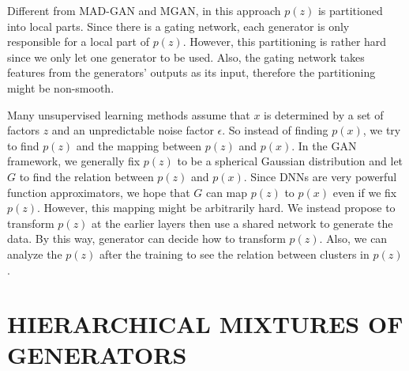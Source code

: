 \documentclass[a4paper,onesided,12pt]{report}
\begin{document}
Different from MAD-GAN and MGAN, in this approach $p(z)$ is partitioned into local parts. Since there is a gating network, each generator is only responsible for a local part of $p(z)$. However, this partitioning is rather hard since we only let one generator to be used. Also, the gating network takes features from the generators' outputs as its input, therefore the partitioning might be non-smooth.

Many unsupervised learning methods assume that $x$ is determined by a set of factors $z$ and an unpredictable noise factor $\epsilon$. So instead of finding $p(x)$, we try to find $p(z)$ and the mapping between $p(z)$ and $p(x)$. In the GAN framework, we generally fix $p(z)$ to be a spherical Gaussian distribution and let $G$ to find the relation between $p(z)$ and $p(x)$. Since DNNs are very powerful function approximators, we hope that $G$ can map $p(z)$ to $p(x)$ even if we fix $p(z)$. However, this mapping might be arbitrarily hard. We instead propose to transform $p(z)$ at the earlier layers then use a shared network to generate the data. By this way, generator can decide how to transform $p(z)$. Also, we can analyze the $p(z)$ after the training to see the relation between clusters in $p(z)$.
%
%
\chapter{HIERARCHICAL MIXTURES OF GENERATORS}
\label{chapter:hme}
\end{document}
